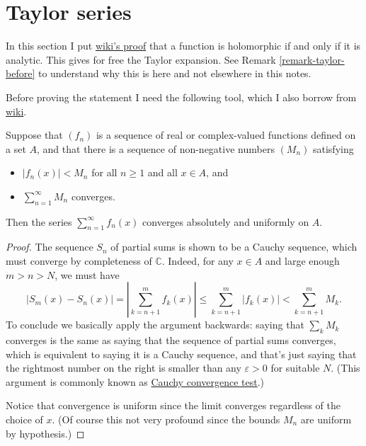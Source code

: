 \section{Taylor series}
\label{section-taylor}

\noindent
In this section I put 
\href{https://en.wikipedia.org/wiki/Analyticity_of_holomorphic_functions}
{wiki's proof}
that a function is holomorphic if and only if it is analytic.
This gives for free the Taylor expansion.
See Remark \ref{remark-taylor-before} to understand why this is here
and not elsewhere in this notes.

\medskip\noindent
Before proving the statement I need the following tool,
which I also borrow from
\href{https://en.wikipedia.org/wiki/Weierstrass_M-test}{wiki}.

\begin{theorem}
\label{theorem-m-test}
Suppose that $(f_n)$ is a sequence of real or complex-valued functions
defined on a set $A$, and that there is a sequence
of non-negative numbers $(M_n)$ satisfying
\begin{itemize}
\item $|f_n(x)|<M_n$ for all $n \geq 1$ and all $x \in A$, and
\item $\sum_{n=1}^\infty M_n$ converges.
\end{itemize}

\noindent
Then the series
$\sum_{n=1}^\infty f_n(x)$
converges absolutely and uniformly on $A$.
\end{theorem}

\begin{proof}
The sequence $S_n$ of partial sums is shown to be a Cauchy sequence,
which must converge by completeness of $\mathbb{C}$. Indeed,
for any $x \in A$ and large enough $m>n>N$, we must have
$$
|S_m(x)-S_n(x)|=|\sum_{k=n+1}^mf_k(x)|\leq \sum_{k=n+1}^m|f_k(x)|
<\sum_{k=n+1}^mM_k.
$$
To conclude we basically apply the argument backwards:
saying that $\sum_{k}M_k$ converges is the same as saying
that the sequence of partial sums converges,
which is equivalent to saying it is a Cauchy sequence,
and that's just saying that the rightmost number on the right
is smaller than any $\varepsilon>0$ for suitable $N$.
(This argument is commonly known as 
\href{https://en.wikipedia.org/wiki/Cauchy%27s_convergence_test}{
Cauchy convergence test}.)

Notice that convergence is uniform
since the limit converges regardless of the choice of $x$.
(Of course this not very profound 
since the bounds $M_n$ are uniform by hypothesis.)
\end{proof}

